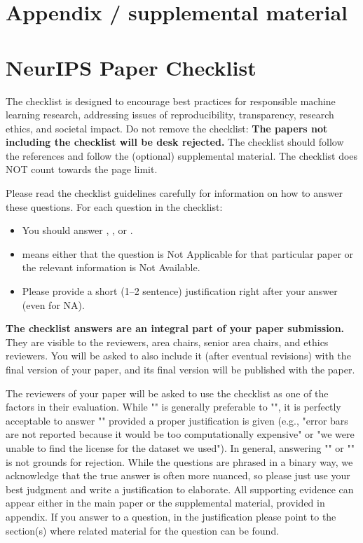 \documentclass{article}
\begin{document}
\appendix

\section{Appendix / supplemental material}

{}

\newpage
\section*{NeurIPS Paper Checklist}

The checklist is designed to encourage best practices for responsible machine learning research, addressing issues of reproducibility, transparency, research ethics, and societal impact. Do not remove the checklist: {\bf The papers not including the checklist will be desk rejected.} The checklist should follow the references and follow the (optional) supplemental material.  The checklist does NOT count towards the page
limit. 

Please read the checklist guidelines carefully for information on how to answer these questions. For each question in the checklist:
\begin{itemize}
    \item You should answer \answerYes{}, \answerNo{}, or \answerNA{}.
    \item \answerNA{} means either that the question is Not Applicable for that particular paper or the relevant information is Not Available.
    \item Please provide a short (1–2 sentence) justification right after your answer (even for NA). 
\end{itemize}

{\bf The checklist answers are an integral part of your paper submission.} They are visible to the reviewers, area chairs, senior area chairs, and ethics reviewers. You will be asked to also include it (after eventual revisions) with the final version of your paper, and its final version will be published with the paper.

The reviewers of your paper will be asked to use the checklist as one of the factors in their evaluation. While "\answerYes{}" is generally preferable to "\answerNo{}", it is perfectly acceptable to answer "\answerNo{}" provided a proper justification is given (e.g., "error bars are not reported because it would be too computationally expensive" or "we were unable to find the license for the dataset we used"). In general, answering "\answerNo{}" or "\answerNA{}" is not grounds for rejection. While the questions are phrased in a binary way, we acknowledge that the true answer is often more nuanced, so please just use your best judgment and write a justification to elaborate. All supporting evidence can appear either in the main paper or the supplemental material, provided in appendix. If you answer \answerYes{} to a question, in the justification please point to the section(s) where related material for the question can be found.
\end{document}
